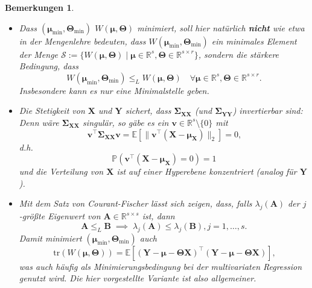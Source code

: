 \documentclass[]{article}
\newcommand{\Pb}{\mathbb{P}}
\newcommand{\E}{\mathbb{E}}
\newcommand{\R}{\mathbb{R}}
\newcommand{\X}{\mathbf{X}}
\newcommand{\Y}{\mathbf{Y}}
\newcommand{\T}{\mathbf{\Theta}}
\newcommand{\muu}{\bm{\mu}}
\newcommand{\Ssigma}{\mathbf{\Sigma}}
\newcommand{\vv}{\mathbf{v}}
\newcommand{\A}{\mathbf{A}}
\newcommand{\B}{\mathbf{B}}
\newcommand{\tr}{\mathrm{tr}}
\newtheorem*{remarks}{Bemerkungen}
\begin{document}
\begin{remarks}
	\hfill
	\normalfont
	\begin{itemize}
		\item Dass $(\muu_{\min}, \T_{\min})$ $W(\muu, \T)$ minimiert, soll hier natürlich \textbf{nicht} wie etwa in der Mengenlehre bedeuten, dass $W(\muu_{\min}, \T_{\min})$ ein minimales Element der Menge $\mathcal{S} := \{W(\muu, \T) \;|\; \muu \in \R^s, \T \in \R^{s \times r}\}$, sondern die stärkere Bedingung, dass 
		$$W(\muu_{\min}, \T_{\min}) \leq_L W(\muu, \T) \quad \forall \muu \in \R^s, \T \in \R^{s \times r} \text{.}$$
		Insbesondere kann es nur eine Minimalstelle geben.
		\item Die Stetigkeit von $\X$ und $\Y$ sichert, dass $\Ssigma_{\X\X}$ (und $\Ssigma_{\Y\Y}$) invertierbar sind: Denn wäre $\Ssigma_{\X\X}$ singulär, so gäbe es ein $\vv \in \R^s \setminus \{0\}$ mit $$\vv^\top \Ssigma_{\X\X} \vv = \E [\| \vv^\top (\X - \muu_{\X}) \|_2] = 0 \text{,}$$
		d.h. $$\Pb(\vv^\top (\X - \muu_{\X}) = 0) = 1$$
		und die Verteilung von $\X$ ist auf einer Hyperebene konzentriert (analog für $\Y$). 
		\item Mit dem Satz von Courant-Fischer \cite[Seite 52 f.]{Iz08} lässt sich zeigen, dass, falls $\lambda_j(\A)$ der $j$-größte Eigenwert von $\A \in \R^{s\times s}$ ist, dann
		$$\A \leq_L \B \; \implies \; \lambda_j(\A) \leq \lambda_j(\B), j=1,\dots,s \text{.}$$
		Damit minimiert $(\muu_{\min}, \T_{\min})$ auch 
		\[\tr(W(\muu, \T)) = \E[(\Y - \muu - \T \X)^{\top} (\Y - \muu - \T \X)] \text{,} \label{eq:2.2} \tag{2.2}\]
		was auch häufig als Minimierungsbedingung bei der multivariaten Regression genutzt wird. Die hier vorgestellte Variante ist also allgemeiner.
	\end{itemize}
\end{remarks}
\end{document}
